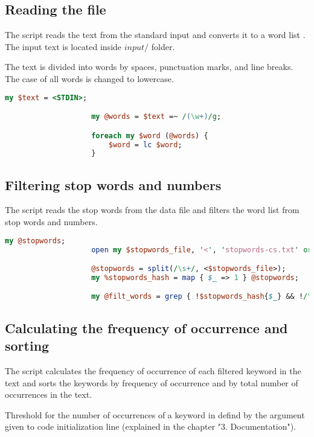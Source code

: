 \documentclass[a4paper,11pt]{article}
\begin{document}
    \hspace{10pt}
    \begin{minipage}[t]{0.5\textwidth} 
            \subsection{Reading the file}
                The script reads the text from the standard input and converts it to a word list \cite{filter}. The input text is located inside $input/$ folder.
                \par The text is divided into words by spaces, punctuation marks, and line breaks. The case of all words is changed to lowercase.
                \begin{lstlisting}[language=Perl]
                    my $text = <STDIN>;

                    my @words = $text =~ /(\w+)/g;

                    foreach my $word (@words) {
                        $word = lc $word;
                    }
                \end{lstlisting}    
                
            \subsection{Filtering stop words and numbers}
                The script reads the stop words from the data file \cite{stopwords} and filters the word list from stop words and numbers.
                \begin{lstlisting}[language=Perl]
                    my @stopwords;
                    open my $stopwords_file, '<', 'stopwords-cs.txt' or die "Cannot open stopwords-cs.txt: $!";

                    @stopwords = split(/\s+/, <$stopwords_file>);
                    my %stopwords_hash = map { $_ => 1 } @stopwords;

                    my @filt_words = grep { !$stopwords_hash{$_} && !/\d/ } @words;
                \end{lstlisting}

            \subsection{Calculating the frequency of occurrence and sorting}
                The script calculates the frequency of occurrence of each filtered keyword in the text and sorts the keywords by frequency of occurrence \cite{sorting} and by total number of occurrences in the text. 
                \par Threshold for the number of occurrences of a keyword in defind by the argument given to code initialization line \cite{arg} (explained in the chapter "3. Documentation").
    \end{minipage}
\end{document}
